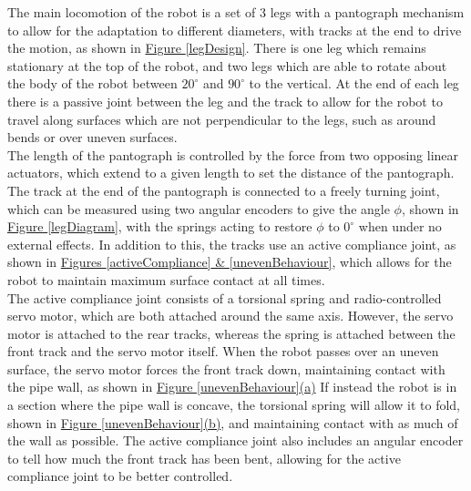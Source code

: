 \documentclass[11pt]{article}		%
\begin{document}
			The main locomotion of the robot is a set of 3 legs with a pantograph mechanism  to allow for the adaptation to different diameters, with tracks at the end to drive the motion, as shown in \hyperref[legDesign]{Figure \ref*{legDesign}}.
			There is one leg which remains stationary at the top of the robot, and two legs which are able to rotate about the body of the robot between $20^\circ$ and $90^\circ$ to the vertical.
			At the end of each leg there is a passive joint between the leg and the track to allow for the robot to travel along surfaces which are not perpendicular to the legs, such as around bends or over uneven surfaces.
			\\
			The length of the pantograph is controlled by the force from two opposing linear actuators, which extend to a given length to set the distance of the pantograph.
			The track at the end of the pantograph is connected to a freely turning joint, which can be measured using two angular encoders to give the angle $\phi$, shown in \hyperref[legDiagram]{Figure \ref*{legDiagram}}, with the springs acting to restore $\phi$ to $0^\circ$ when under no external effects.
			In addition to this, the tracks use an active compliance joint, as shown in \hyperref[activeCompliance]{Figures \ref*{activeCompliance} \& \ref*{unevenBehaviour}}, which allows for the robot to maintain maximum surface contact at all times.
			\\
			The active compliance joint consists of a torsional spring and radio-controlled servo motor, which are both attached around the same axis.
			However, the servo motor is attached to the rear tracks, whereas the spring is attached between the front track and the servo motor itself.
			When the robot passes over an uneven surface, the servo motor forces the front track down, maintaining contact with the pipe wall, as shown in \hyperref[unevenBehaviour]{Figure \ref*{unevenBehaviour}(a)}
			If instead the robot is in a section where the pipe wall is concave, the torsional spring will allow it to fold, shown in \hyperref[unevenBehaviour]{Figure \ref*{unevenBehaviour}(b)}, and maintaining contact with as much of the wall as possible.
			The active compliance joint also includes an angular encoder to tell how much the front track has been bent, allowing for the active compliance joint to be better controlled.
\end{document}
